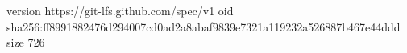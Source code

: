 version https://git-lfs.github.com/spec/v1
oid sha256:ff8991882476d294007cd0ad2a8abaf9839e7321a119232a526887b467e44ddd
size 726
